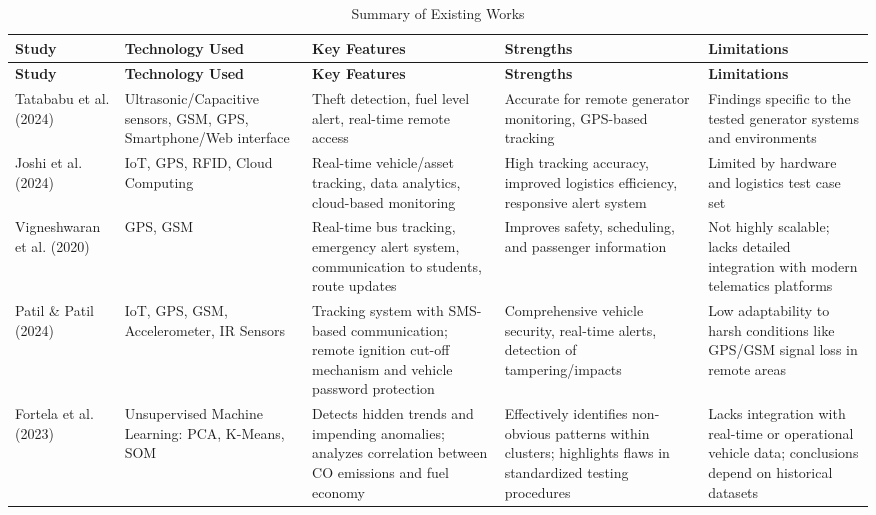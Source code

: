 \FloatBarrier
{\scriptsize
\setlength{\tabcolsep}{3pt}
\renewcommand{\arraystretch}{0.95}
\begin{longtable}{|p{}|p{}|p{}|p{}|p{}|}
\caption{Summary of Existing Works}
\label{tab:existingworks} \\
\hline
\textbf{Study} & \textbf{Technology Used} & \textbf{Key Features} & \textbf{Strengths} & \textbf{Limitations} \\
\hline
\endfirsthead

\hline
\textbf{Study} & \textbf{Technology Used} & \textbf{Key Features} & \textbf{Strengths} & \textbf{Limitations} \\
\hline
\endhead

Tatababu et al. (2024) \cite{tatababu2024smart} & Ultrasonic/Capacitive sensors, GSM, GPS, Smartphone/Web interface & Theft detection, fuel level alert, real-time remote access & Accurate for remote generator monitoring, GPS-based tracking & Findings specific to the tested generator systems and environments \\
\hline
Joshi et al. (2024) \cite{joshi2024intelligent} & IoT, GPS, RFID, Cloud Computing & Real-time vehicle/asset tracking, data analytics, cloud-based monitoring & High tracking accuracy, improved logistics efficiency, responsive alert system & Limited by hardware and logistics test case set \\
\hline
Vigneshwaran et al. (2020) \cite{vigneshwaran2020design} & GPS, GSM & Real-time bus tracking, emergency alert system, communication to students, route updates & Improves safety, scheduling, and passenger information & Not highly scalable; lacks detailed integration with modern telematics platforms \\
\hline
Patil \& Patil (2024) \cite{patil2024iot} & IoT, GPS, GSM, Accelerometer, IR Sensors & Tracking system with SMS-based communication; remote ignition cut-off mechanism and vehicle password protection & Comprehensive vehicle security, real-time alerts, detection of tampering/impacts & Low adaptability to harsh conditions like GPS/GSM signal loss in remote areas \\
\hline
Fortela et al. (2023) \cite{fortela2023unsupervised} & Unsupervised Machine Learning: PCA, K-Means, SOM & Detects hidden trends and impending anomalies; analyzes correlation between CO emissions and fuel economy & Effectively identifies non-obvious patterns within clusters; highlights flaws in standardized testing procedures & Lacks integration with real-time or operational vehicle data; conclusions depend on historical datasets \\

\end{longtable}}
